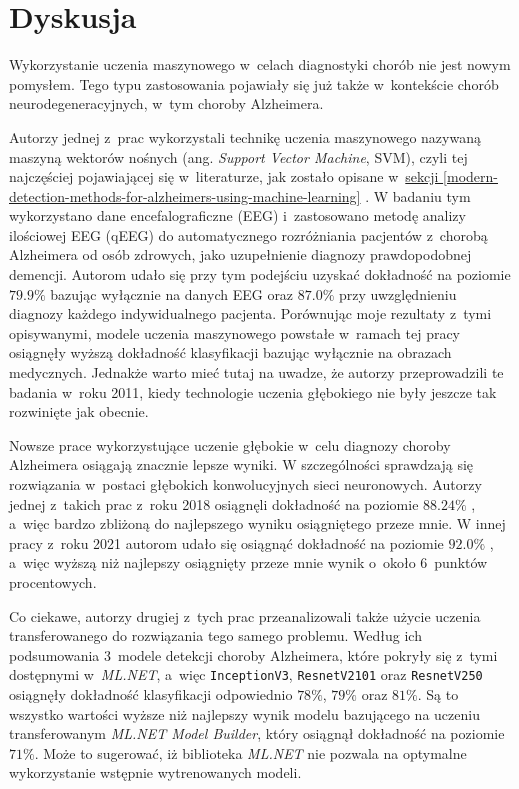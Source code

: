 \chapter{Dyskusja}

Wykorzystanie uczenia maszynowego w~celach diagnostyki chorób nie jest nowym pomysłem.
Tego typu zastosowania pojawiały się już także w~kontekście chorób neurodegeneracyjnych, w~tym choroby Alzheimera.

Autorzy jednej z~prac wykorzystali technikę uczenia maszynowego nazywaną maszyną wektorów nośnych (ang. \emph{Support Vector Machine}, SVM), czyli tej najczęściej pojawiającej się w~literaturze, jak zostało opisane w~\hyperref[modern-detection-methods-for-alzheimers-using-machine-learning]{sekcji \ref*{modern-detection-methods-for-alzheimers-using-machine-learning}} \cite{trambaiolli2011improving}.
W badaniu tym wykorzystano dane encefalograficzne (EEG) i~zastosowano metodę analizy ilościowej EEG (qEEG) do automatycznego rozróżniania pacjentów z~chorobą Alzheimera od osób zdrowych, jako uzupełnienie diagnozy prawdopodobnej demencji.
Autorom udało się przy tym podejściu uzyskać dokładność na poziomie $79.9\%$ bazując wyłącznie na danych EEG oraz $87.0\%$ przy uwzględnieniu diagnozy każdego indywidualnego pacjenta.
Porównując moje rezultaty z~tymi opisywanymi, modele uczenia maszynowego powstałe w~ramach tej pracy osiągnęły wyższą dokładność klasyfikacji bazując wyłącznie na obrazach medycznych.
Jednakże warto mieć tutaj na uwadze, że autorzy przeprowadzili te badania w~roku 2011, kiedy technologie uczenia głębokiego nie były jeszcze tak rozwinięte jak obecnie.

Nowsze prace wykorzystujące uczenie głębokie w~celu diagnozy choroby Alzheimera osiągają znacznie lepsze wyniki.
W szczególności sprawdzają się rozwiązania w~postaci głębokich konwolucyjnych sieci neuronowych.
Autorzy jednej z~takich prac z~roku 2018 osiągnęli dokładność na poziomie $88.24\%$ \cite{shahbaz2019classification}, a~więc bardzo zbliżoną do najlepszego wyniku osiągniętego przeze mnie.
W innej pracy z~roku 2021 autorom udało się osiągnąć dokładność na poziomie $92.0\%$ \cite{ebrahimi2021deep}, a~więc wyższą niż najlepszy osiągnięty przeze mnie wynik o~około 6~punktów procentowych.

Co ciekawe, autorzy drugiej z~tych prac przeanalizowali także użycie uczenia transferowanego do rozwiązania tego samego problemu.
Według ich podsumowania 3~modele detekcji choroby Alzheimera, które pokryły się z~tymi dostępnymi w~\emph{ML.NET}, a~więc \lstinline{InceptionV3}, \lstinline{ResnetV2101} oraz \lstinline{ResnetV250} osiągnęły dokładność klasyfikacji odpowiednio $78\%$, $79\%$ oraz $81\%$.
Są to wszystko wartości wyższe niż najlepszy wynik modelu bazującego na uczeniu transferowanym \emph{ML.NET Model Builder}, który osiągnął dokładność na poziomie $71\%$.
Może to sugerować, iż biblioteka \emph{ML.NET} nie pozwala na optymalne wykorzystanie wstępnie wytrenowanych modeli.

